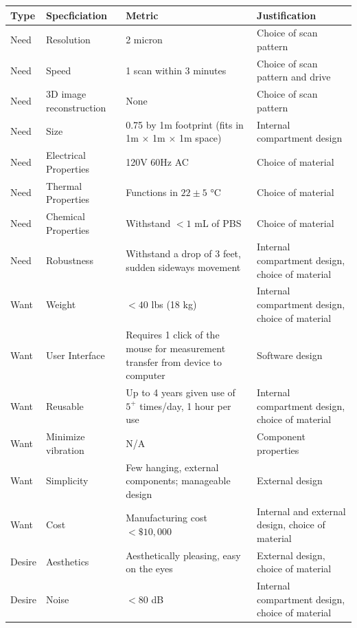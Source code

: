 \documentclass{article}
\begin{document}
\begin{table}[h]
  \centering
  \begin{tabularx}{\textwidth}{llXX}
    \toprule
    \textbf{Type} & \textbf{Specficiation} & \textbf{Metric} & \textbf{Justification} \\
    \hline
    Need & Resolution & 2 micron & Choice of scan pattern \\
    Need & Speed & 1 scan within 3 minutes & Choice of scan pattern and drive \\
    Need & 3D image reconstruction & None & Choice of scan pattern \\
    Need & Size & 0.75 by 1m footprint (fits in 1m $\times$ 1m $\times$ 1m space) & Internal compartment design \\
    Need & Electrical Properties & 120V 60Hz AC & Choice of material \\
    Need & Thermal Properties & Functions in $22\pm5$ °C & Choice of material \\
    Need & Chemical Properties & Withstand $<1$ mL of PBS & Choice of material \\
    Need & Robustness & Withstand a drop of 3 feet, sudden sideways movement & Internal compartment design, choice of material \\
    Want & Weight & $<40$ lbs (18 kg) & Internal compartment design, choice of material \\
    Want & User Interface & Requires 1 click of the mouse for measurement transfer from device to computer & Software design \\
    Want & Reusable & Up to 4 years given use of $5^+$ times/day, 1 hour per use & Internal compartment design, choice of material \\
    Want & Minimize vibration & N/A & Component properties \\
    Want & Simplicity & Few hanging, external components; manageable design & External design \\
    Want & Cost & Manufacturing cost $<\$10,000$ & Internal and external design, choice of material \\
    Desire & Aesthetics & Aesthetically pleasing, easy on the eyes & External design, choice of material \\
    Desire & Noise & $<80$ dB & Internal compartment design, choice of material \\
    \bottomrule
  \end{tabularx}
  \label{tab:priors}
\end{table}
\end{document}
